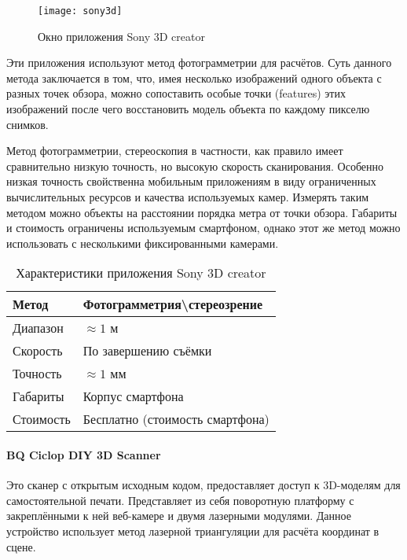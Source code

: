         \begin{figure}[H]
            \centering
            \texttt{[image: sony3d]}\label{pic:sony3d}
            \caption{Окно приложения Sony 3D creator}
        \end{figure}

        Эти приложения используют метод фотограмметрии для расчётов. Суть данного метода заключается в том, что, имея несколько изображений одного объекта с разных точек обзора, можно сопоставить особые точки (features) этих изображений после чего восстановить модель объекта по каждому пикселю снимков\cite{Guzhov}.

        Метод фотограмметрии, стереоскопия в частности, как правило имеет сравнительно низкую точность, но высокую скорость сканирования. Особенно низкая точность свойственна мобильным приложениям в виду ограниченных вычислительных ресурсов и качества используемых камер. Измерять таким методом можно объекты на расстоянии порядка метра от точки обзора. Габариты и стоимость ограничены используемым смартфоном, однако этот же метод можно использовать с несколькими фиксированными камерами.

        \begin{table}[H]
            \centering
            \caption{Характеристики приложения Sony 3D creator}\label{table:sony3d}
            \begin{tabular}{|l|l|}\hline
                Метод&Фотограмметрия\textbackslash{}стереозрение\\ \hline
                Диапазон&$\approx 1$ м\\ \hline
                Скорость&По завершению съёмки\\ \hline
                Точность&$\approx 1$ мм\\ \hline
                Габариты&Корпус смартфона\\ \hline
                Стоимость&Бесплатно (стоимость смартфона)\\ \hline
            \end{tabular}
        \end{table}

    \paragraph{BQ Ciclop DIY 3D Scanner}
        Это сканер с открытым исходным кодом, предоставляет доступ к 3D-моделям для самостоятельной печати. Представляет из себя поворотную платформу с закреплёнными к ней веб-камере и двумя лазерными модулями. Данное устройство использует метод лазерной триангуляции для расчёта координат в сцене.

